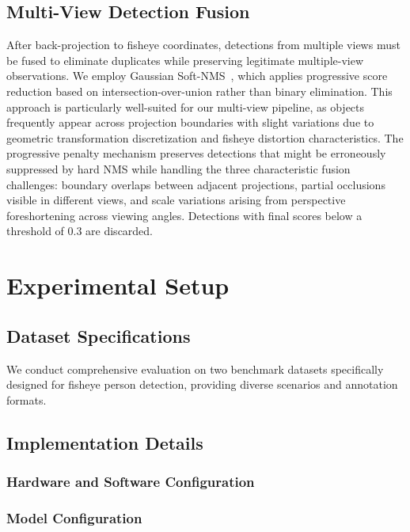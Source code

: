 \documentclass[twocolumn]{svjour3}          %
\begin{document}
\subsection{Multi-View Detection Fusion}

After back-projection to fisheye coordinates, detections from multiple views must be fused to eliminate duplicates while preserving legitimate multiple-view observations. We employ Gaussian Soft-NMS~\cite{seidel2019improved}, which applies progressive score reduction based on intersection-over-union rather than binary elimination. This approach is particularly well-suited for our multi-view pipeline, as objects frequently appear across projection boundaries with slight variations due to geometric transformation discretization and fisheye distortion characteristics. The progressive penalty mechanism preserves detections that might be erroneously suppressed by hard NMS while handling the three characteristic fusion challenges: boundary overlaps between adjacent projections, partial occlusions visible in different views, and scale variations arising from perspective foreshortening across viewing angles. Detections with final scores below a threshold of 0.3 are discarded.


\section{Experimental Setup}

\subsection{Dataset Specifications}

We conduct comprehensive evaluation on two benchmark datasets specifically designed for fisheye person detection, providing diverse scenarios and annotation formats.

\subsection{Implementation Details}
\subsubsection{Hardware and Software Configuration}

\subsubsection{Model Configuration}
\end{document}
